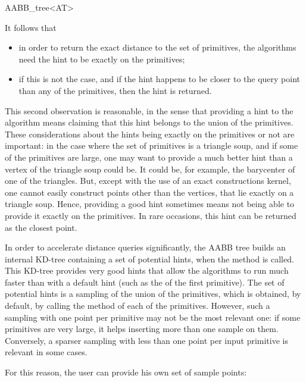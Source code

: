 \begin{ccRefClass}{AABB_tree<AT>}
\begin{ccAdvanced}
It follows that 
\begin{itemize}
\item in order to return the exact distance to the set of primitives, the algorithms need the hint to be exactly on the primitives;
\item if this is not the case, and if the hint happens to be closer to the query point than any of the primitives, then the hint is returned.
\end{itemize}
This second observation is reasonable, in the sense that providing a hint to the algorithm means claiming that this hint belongs to the union of the primitives. These considerations about the hints being exactly on the primitives or not are important: in the case where the set of primitives is a triangle soup, and if some of the primitives are large, one may want to provide a much better hint than a vertex of the triangle soup could be. It could be, for example, the barycenter of one of the triangles. But, except with the use of an exact constructions kernel, one cannot easily construct points other than the vertices, that lie exactly on a triangle soup. Hence, providing a good hint sometimes means not being able to provide it exactly on the primitives. In rare occasions, this hint can be returned as the closest point.

In order to accelerate distance queries significantly, the AABB tree builds an internal KD-tree containing a set of potential hints, when the method  is called. This KD-tree provides very good hints that allow the algorithms to run much faster than with a default hint (such as the  of the first primitive). The set of potential hints is a sampling of the union of the primitives, which is obtained, by default, by calling the method  of each of the primitives. However, such a sampling with one point per primitive may not be the most relevant one: if some primitives are very large, it helps inserting more than one sample on them. Conversely, a sparser sampling with less than one point per input primitive is relevant in some cases.

For this reason, the user can provide his own set of sample points:



\end{ccAdvanced}
\end{ccRefClass}
